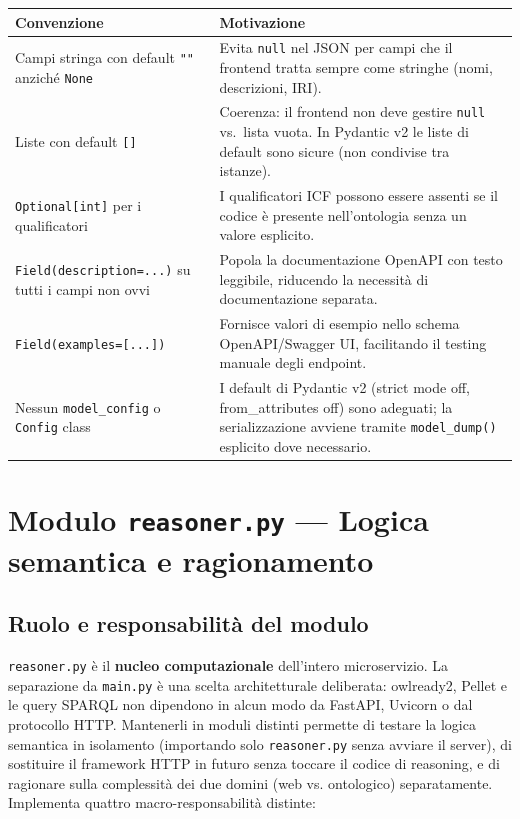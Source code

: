 \documentclass[a4paper,12pt]{article}
\begin{document}
\begin{longtable}{L{4.5cm} L{8cm}}
  \toprule
  \textbf{Convenzione} & \textbf{Motivazione} \\
  \midrule
  \endhead
  Campi stringa con default \texttt{""} anzich\'{e} \texttt{None} &
    Evita \texttt{null} nel JSON per campi che il frontend tratta
    sempre come stringhe (nomi, descrizioni, IRI). \\[4pt]
  Liste con default \texttt{[]} &
    Coerenza: il frontend non deve gestire \texttt{null} vs.\
    lista vuota. In Pydantic v2 le liste di default sono sicure
    (non condivise tra istanze). \\[4pt]
  \texttt{Optional[int]} per i qualificatori &
    I qualificatori ICF possono essere assenti se il codice
    \`{e} presente nell'ontologia senza un valore esplicito. \\[4pt]
  \texttt{Field(\allowbreak description=...)} su tutti i campi non ovvi &
    Popola la documentazione OpenAPI con testo leggibile,
    riducendo la necessit\`{a} di documentazione separata. \\[4pt]
  \texttt{Field(examples=[...])} &
    Fornisce valori di esempio nello schema OpenAPI/Swagger UI,
    facilitando il testing manuale degli endpoint. \\[4pt]
  Nessun \texttt{model\_config} o \texttt{Config} class &
    I default di Pydantic v2 (strict mode off, from\_attributes off)
    sono adeguati; la serializzazione avviene tramite
    \texttt{model\_dump()} esplicito dove necessario. \\
  \bottomrule
\end{longtable}

\section{Modulo \texttt{reasoner.py} --- Logica semantica e ragionamento}

\subsection{Ruolo e responsabilit\`{a} del modulo}

\texttt{reasoner.py} \`{e} il \textbf{nucleo computazionale} dell'intero
microservizio. La separazione da \texttt{main.py} \`{e} una scelta architetturale
deliberata: owlready2, Pellet e le query SPARQL non dipendono in alcun modo da
FastAPI, Uvicorn o dal protocollo HTTP. Mantenerli in moduli distinti permette
di testare la logica semantica in isolamento (importando solo \texttt{reasoner.py}
senza avviare il server), di sostituire il framework HTTP in futuro senza
toccare il codice di reasoning, e di ragionare sulla complessit\`{a} dei due
domini (web vs. ontologico) separatamente. Implementa quattro macro-responsabilit\`{a} distinte:
\end{document}
